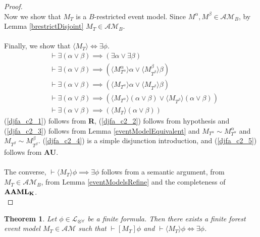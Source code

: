 \documentclass[12pt, a4paper, titlepage]{article}
\newtheorem{thm}{Theorem}[subsection]
\numberwithin{equation}{section}
\newcommand{\sqex}[1]{[{#1}]}
\newcommand{\anex}[1]{\langle {#1} \rangle}
\newcommand{\lang}{\mathcal{L}}
\newcommand{\langArbAct}{\lang_{\otimes\forall}}
\newcommand{\AXK}{{\bf K}}
\newcommand{\AXAAML}{${\bf AAML_{\AXK}}$}
\newcommand{\axAU}{{\bf AU}}
\newcommand{\axR}{{\bf R}}
\newcommand{\eventClass}{\mathcal{AM}}
\begin{document}
\begin{proof}
\\
Now we show that $M_T$ is a $B$-restricted event model.
Since $M^\alpha, M^\beta \in \eventClass_B$, by Lemma \ref{brestrictDisjoint} $M_T \in
\eventClass_B$.\\
\\
Finally, we show that $\anex{M_T} \iff \exists \phi$.
\begin{align}
	&\vdash \exists (\alpha \lor \beta) \implies (\exists \alpha \lor \exists \beta) \label{djfa_c2_1} \\
	&\vdash \exists (\alpha \lor \beta) \implies (\anex{ M^\alpha_{T^\alpha} } \alpha \lor
			\anex{ M^\beta_{T^\beta} }\beta) \label{djfa_c2_2}\\
	&\vdash \exists (\alpha \lor \beta) \implies (\anex{M_{T^\alpha}} \alpha \lor \anex{M_{T^\beta}}
			\beta)\label{djfa_c2_3}\\
	&\vdash \exists (\alpha \lor \beta) \implies (\anex{M_{T^\alpha}} (\alpha \lor \beta) \lor \anex{M_{T^\beta}}
			(\alpha \lor \beta))\label{djfa_c2_4}\\
	&\vdash \exists (\alpha \lor \beta) \implies (\anex{M_T} (\alpha \lor \beta))\label{djfa_c2_5}
\end{align}
(\ref{djfa_c2_1}) follows from \axR, (\ref{djfa_c2_2}) follows from hypothesis and
(\ref{djfa_c2_3}) follows from Lemma \ref{eventModelEquivalent} and $M_{T^\alpha} \sim M^\alpha_{T^\alpha}$ and $M_{T^\beta}
\sim M^\beta_{T^\beta}$.
(\ref{djfa_c2_4}) is a simple disjunction introduction, and (\ref{djfa_c2_5}) follows from \axAU.\\
\\
The converse, $\vdash \anex{M_T} \phi \implies \exists \phi$ follows from a semantic
argument, from $M_T \in \eventClass_B$, from Lemma \ref{eventModelsRefine} and the completeness of \AXAAML.\\
\end{proof}

\begin{thm} \label{goalAchievementK}
Let $\phi \in \langArbAct$ be a finite formula.
Then there exists a finite forest event model $M_T \in \eventClass$ such that
$\vdash \sqex{M_T}\phi$ and $\vdash \anex{ M_T } \phi \iff \exists \phi$.
\end{thm}
\end{document}
